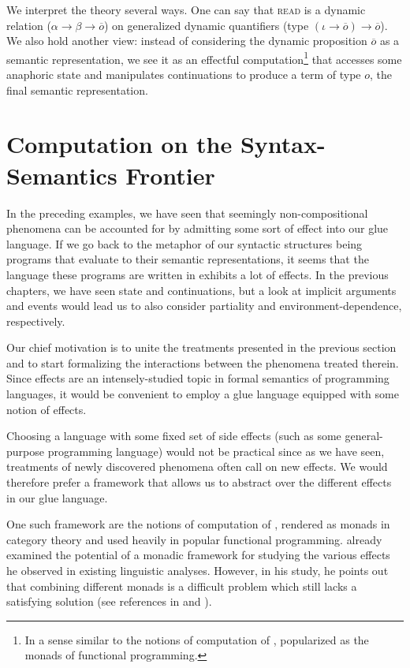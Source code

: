 \documentclass{article}
\begin{document}
We interpret the theory several ways. One can say that \textsc{read} is a
dynamic relation ($\alpha \to \beta \to \overline{o}$) on generalized dynamic
quantifiers (type $(\iota \to \overline{o}) \to \overline{o}$). We also hold
another view: instead of considering the dynamic proposition $\overline{o}$ as
a semantic representation, we see it as an effectful computation\footnote{In a
  sense similar to the notions of computation of \citet{moggi1991notions},
  popularized as the monads of functional programming.} that accesses some
anaphoric state and manipulates continuations to produce a term of type $o$,
the final semantic representation.


\section{Computation on the Syntax-Semantics Frontier}

In the preceding examples, we have seen that seemingly non-compositional
phenomena can be accounted for by admitting some sort of effect into our glue
language. If we go back to the metaphor of our syntactic structures being
programs that evaluate to their semantic representations, it seems that the
language these programs are written in exhibits a lot of effects. In the
previous chapters, we have seen state and continuations, but a look at
implicit arguments and events would lead us to also consider partiality and
environment-dependence, respectively.

Our chief motivation is to unite the treatments presented in the previous
section and to start formalizing the interactions between the phenomena
treated therein. Since effects are an intensely-studied topic in formal
semantics of programming languages, it would be convenient to employ a glue
language equipped with some notion of effects.

Choosing a language with some fixed set of side effects (such as some
general-purpose programming language) would not be practical since as we have
seen, treatments of newly discovered phenomena often call on new effects. We
would therefore prefer a framework that allows us to abstract over the
different effects in our glue language.

One such framework are the notions of computation of
\citet{moggi1991notions}, rendered as monads in category theory and used
heavily in popular functional programming. \citet{shan2002monads} already
examined the potential of a monadic framework for studying the various effects
he observed in existing linguistic analyses. However, in his study, he points
out that combining different monads is a difficult problem which still lacks a
satisfying solution (see references in \cite{shan2002monads} and
\citet{kammar2013handlers}).
\end{document}

